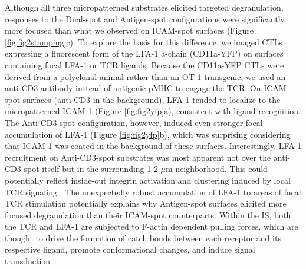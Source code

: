 Although all three micropatterned substrates elicited targeted degranulation, responses to the Dual-spot and Antigen-spot configurations were significantly more focused than what we observed on ICAM-spot surfaces (Figure \ref{fig:fig2stamping}c). To explore the basis for this difference, we imaged CTLs expressing a fluorescent form of the LFA-1 a-chain (CD11a-YFP) on surfaces containing focal LFA-1 or TCR ligands. Because the CD11a-YFP CTLs were derived from a polyclonal animal rather than an OT-1 transgenic, we used an anti-CD3 antibody instead of antigenic pMHC to engage the TCR. On ICAM-spot surfaces (anti-CD3 in the background), LFA-1 tended to localize to the micropatterned ICAM-1 (Figure \ref{fig:fig2yfp}a), consistent with ligand recognition. The Anti-CD3-spot configuration, however, induced even stronger focal accumulation of LFA-1 (Figure \ref{fig:fig2yfp}b), which was surprising considering that ICAM-1 was coated in the background of these surfaces. Interestingly, LFA-1 recruitment on Anti-CD3-spot substrates was most apparent not over the anti-CD3 spot itself but in the surrounding 1-2 $\mu$m neighborhood. This could potentially reflect inside-out integrin activation and clustering induced by local TCR signaling \cite{Kinash2005}. The unexpectedly robust accumulation of LFA-1 to areas of focal TCR stimulation potentially explains why Antigen-spot surfaces elicited more focused degranulation than their ICAM-spot counterparts. Within the IS, both the TCR and LFA-1 are subjected to F-actin dependent pulling forces, which are thought to drive the formation of catch bonds between each receptor and its respective ligand, promote conformational changes, and induce signal transduction \cite{Lee2015, Comrie2015_2, Liu2005, Chen2010}. 

